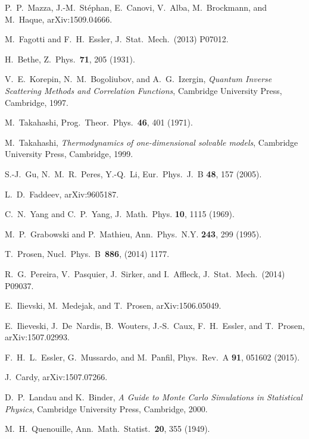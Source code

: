 \documentclass[11pt]{iopart}
\begin{document}
\begin{thebibliography}{99}
P.~P.~Mazza, J.-M.~St\'ephan, E.~Canovi, V.~Alba, M.~Brockmann, and M.~Haque, 
arXiv:1509.04666.

M.~Fagotti and F.~H.~Essler, J.\ Stat.\ Mech.\ (2013) P07012. 

H.~Bethe, Z.\ Phys.\ {\bf 71}, 205 (1931). 

V.~E.~Korepin, N.~M.~Bogoliubov, and A.~G.~Izergin, \emph{Quantum 
Inverse Scattering Methods and Correlation Functions}, Cambridge 
University Press, Cambridge, 1997. 

M.~Takahashi, Prog.\ Theor.\ Phys.\ {\bf 46}, 401 (1971). 

M.~Takahashi, {\it Thermodynamics of one-dimensional solvable models}, 
Cambridge University Press, Cambridge, 1999. 

S.-J.~Gu, N.~M.~R.~Peres, Y.-Q.~Li, Eur.\ Phys.\ J.\ B {\bf 48}, 157 (2005). 

L.~D.~Faddeev, arXiv:9605187.

C.~N.~Yang and C.~P.~Yang, J.\ Math.\ Phys. {\bf 10}, 1115 (1969).

M.~P.~Grabowski and P.~Mathieu, Ann.\ Phys.\ N.Y. {\bf 243}, 
299 (1995). 

T.~Prosen, Nucl.\ Phys.\ B\ {\bf 886}, (2014) 1177.

R.~G.~Pereira, V.~Pasquier, J.~Sirker, and I.~Affleck, J.\ Stat.\ Mech.\ 
(2014) P09037. 

E.~Ilievski, M.~Medejak, and T.~Prosen, arXiv:1506.05049.

E.~Ilieveski, J.~De~Nardis, B.~Wouters, J.-S.~Caux, F.~H.~Essler, and T.~Prosen, 
arXiv:1507.02993. 

F.~H.~L.~Essler, G.~Mussardo, and M.~Panfil, Phys.\ Rev.\ A {\bf 91}, 051602 (2015). 

J.~Cardy,  arXiv:1507.07266.


D.~P.~Landau and K.~Binder, \emph{A Guide to Monte Carlo Simulations in 
Statistical Physics}, Cambridge University Press, Cambridge, 2000.

M.~H.~Quenouille, Ann.\ Math.\ Statist.\ {\bf 20}, 355 (1949).


\end{thebibliography}
\end{document}
